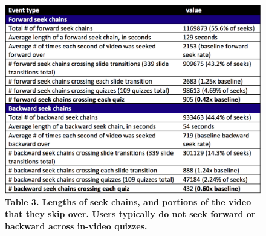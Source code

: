 \documentclass{sigchi}
\begin{document}




\begin{figure}
\includegraphics[width=1.0\columnwidth]{table-of-seeks}
\small{\textbf{Table 3. Lengths of seek chains, and portions of the video that they skip over. Users typically do not seek forward or backward across in-video quizzes.}}
\label{fig:table-of-seeks}
\end{figure}
\end{document}
